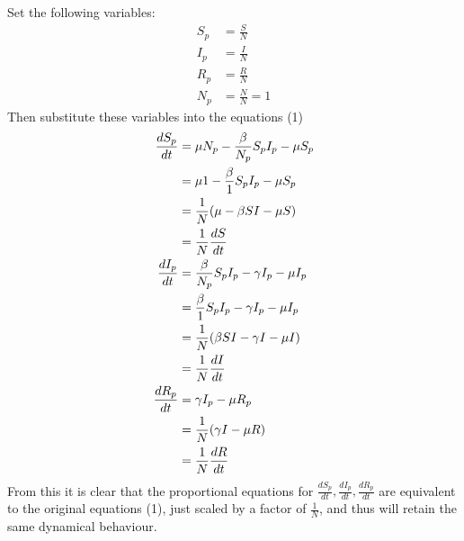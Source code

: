 Set the following variables:
\begin{align*}
    S_p &= \frac{S}{N}\\
    I_p &= \frac{I}{N}\\
    R_p &= \frac{R}{N}\\
    N_p &= \frac{N}{N} = 1
\end{align*}
Then substitute these variables into the equations (1)
\begin{align}
  \frac{dS_p}{dt} &= \mu N_p -\frac{\beta}{N_p} S_p I_p - \mu S_p\\
                  &= \mu 1 -\frac{\beta}{1} S_p I_p - \mu S_p\\
                  &= \frac{1}{N}(\mu -\beta SI - \mu S)\\
                  &= \frac{1}{N} \frac{dS}{dt}\\
  \vspace{8pt}
  \frac{dI_p}{dt} &= \frac{\beta}{N_p} S_p I_p - \gamma I_p - \mu I_p\\
                  &= \frac{\beta}{1} S_p I_p - \gamma I_p - \mu I_p\\
                  &= \frac{1}{N} (\beta SI - \gamma I - \mu I)\\
                  &= \frac{1}{N} \frac{dI}{dt}\\
  \vspace{8pt}
  \frac{dR_p}{dt} &= \gamma I_p - \mu R_p\\
                  &= \frac{1}{N} (\gamma I - \mu R)\\
                  &= \frac{1}{N} \frac{dR}{dt}
\end{align}
From this it is clear that the proportional equations for $\frac{dS_p}{dt},\frac{dI_p}{dt},\frac{dR_p}{dt}$ are equivalent to the original equations (1), just scaled by a factor of $\frac{1}{N}$, and thus will retain the same dynamical behaviour.
